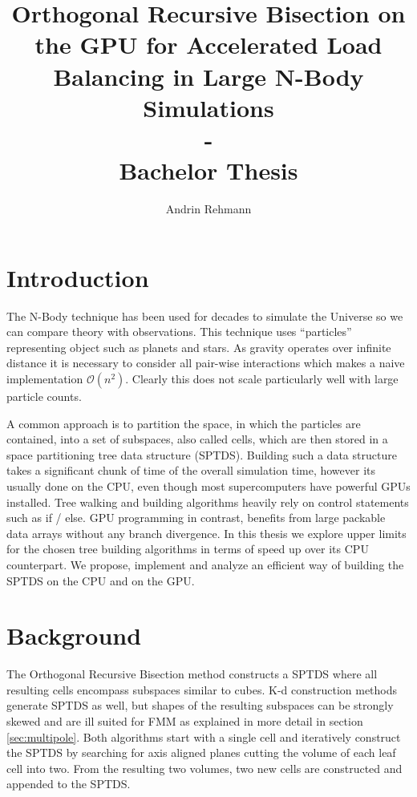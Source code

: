 \documentclass[]{article}
\title{Orthogonal Recursive Bisection on the GPU for Accelerated Load Balancing in Large N-Body Simulations \\ - \\ Bachelor Thesis}
\author{Andrin Rehmann}
\begin{document}
\maketitle

\newpage

\tableofcontents

\newpage
\section{Introduction}


The N-Body technique has been used for decades to simulate the Universe so we can compare theory with observations. This technique uses ``particles'' representing object such as planets and stars. As gravity operates over infinite distance it is necessary to consider all pair-wise interactions which makes a naive implementation $\mathcal{O}(n^2)$. Clearly this does not scale particularly well with large particle counts.

A common approach is to partition the space, in which the particles are contained, into a set of subspaces, also called cells, which are then stored in a space partitioning tree data structure (SPTDS). Building such a data structure takes a significant chunk of time of the overall simulation time, however its usually done on the CPU, even though most supercomputers have powerful GPUs installed. Tree walking and building algorithms heavily rely on control statements such as if / else. GPU programming in contrast, benefits from large packable data arrays without any branch divergence. In this thesis we explore upper limits for the chosen tree building algorithms in terms of speed up over its CPU counterpart. We propose, implement and analyze an efficient way of building the SPTDS on the CPU and on the GPU. 


\newpage
\section{Background}

The Orthogonal Recursive Bisection method constructs a SPTDS where all resulting cells encompass subspaces similar to cubes. K-d construction methods generate SPTDS as well, but shapes of the resulting subspaces can be strongly skewed and are ill suited for FMM as explained in more detail in section \ref{sec:multipole}. Both algorithms start with a single cell and iteratively construct the SPTDS by searching for axis aligned planes cutting the volume of each leaf cell into two. From the resulting two volumes, two new cells are constructed and appended to the SPTDS. 
\end{document}
